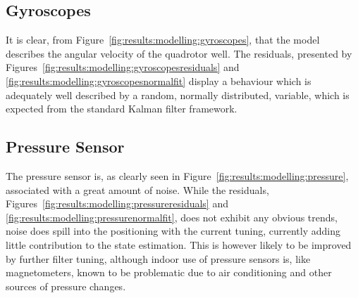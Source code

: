     \subsection{Gyroscopes}
        \label{ssec:results:modelling:gyroscopes}
        It is clear, from Figure~\ref{fig:results:modelling:gyroscopes}, that
        the model describes the angular velocity of the quadrotor well.
        The residuals, presented by Figures~\ref{fig:results:modelling:gyroscopesresiduals}
        and \ref{fig:results:modelling:gyroscopesnormalfit}
        display a behaviour which is adequately well described by a random,
        normally distributed, variable, which is expected from the
        standard Kalman filter framework.

    \subsection{Pressure Sensor}
        The pressure sensor is, as clearly seen in Figure~\ref{fig:results:modelling:pressure},
        associated with a great amount of noise. While the residuals,
        Figures~\ref{fig:results:modelling:pressureresiduals} and \ref{fig:results:modelling:pressurenormalfit},
        does not exhibit any obvious trends, noise does spill into
        the positioning with the current tuning, currently adding little contribution
        to the state estimation. This is however likely to be improved by further filter tuning,
        although indoor use of pressure sensors is, like magnetometers, known to
        be problematic due to air conditioning and other sources of pressure changes.


